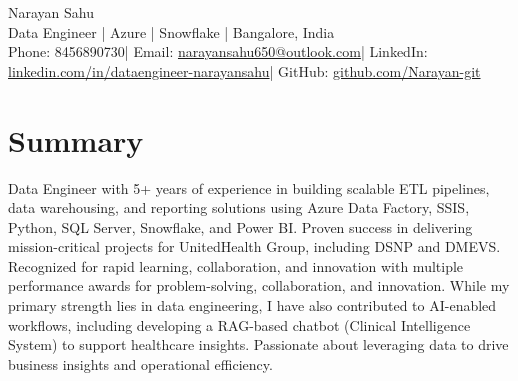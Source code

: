 \documentclass[a4paper,8pt]{article}
\begin{document}
\begin{center}
\begin{minipage}{1\textwidth}
\centering
\textcolor[HTML]{1C033C}{\LARGE Narayan Sahu} \\[3pt]
\textcolor[HTML]{4B28A4}{\large Data Engineer | Azure | Snowflake | Bangalore, India} \\[2pt]

{\footnotesize
\setlength{\spaceskip}{0pt} %
\textcolor[HTML]{371e77}{
    Phone: 8456890730\hspace{0.3em}|\hspace{0.2em}
    Email: \href{mailto:narayansahu650@outlook.com}{narayansahu650@outlook.com}\hspace{0.3em}|\hspace{0.2em}
    LinkedIn: \href{https://www.linkedin.com/in/dataengineer-narayansahu/}{linkedin.com/in/dataengineer-narayansahu}\hspace{0.3em}|\hspace{0.2em}
    GitHub: \href{https://github.com/Narayan-git/Data_Engineering}{github.com/Narayan-git}
}
}
\end{minipage}
\end{center}




\section{Summary}
\vspace{0.2cm}
\color[HTML]{1C033C}\begin{flushleft} Data Engineer with 5+ years of experience in building scalable ETL pipelines, data warehousing, and reporting solutions using Azure Data Factory, SSIS, Python, SQL Server, Snowflake, and Power BI. Proven success in delivering mission-critical projects for UnitedHealth Group, including DSNP and DMEVS. Recognized for rapid learning, collaboration, and innovation with multiple performance awards for problem-solving, collaboration, and innovation. While my primary strength lies in data engineering, I have also contributed to AI-enabled workflows, including developing a RAG-based chatbot (Clinical Intelligence System) to support healthcare insights. Passionate about leveraging data to drive business insights and operational efficiency.
\end{flushleft}
\end{document}
